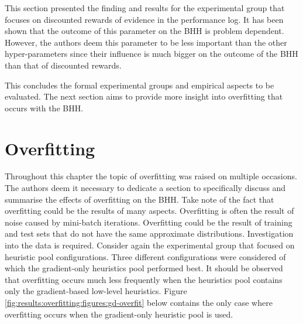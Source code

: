 This section presented the finding and results for the experimental group that focuses on discounted rewards of evidence in the performance log. It has been shown that the outcome of this parameter on the \Ac{BHH} is problem dependent. However, the authors deem this parameter to be less important than the other hyper-parameters since their influence is much bigger on the outcome of the \Ac{BHH} than that of discounted rewards.

This concludes the formal experimental groups and empirical aspects to be evaluated. The next section aims to provide more insight into overfitting that occurs with the \Ac{BHH}.






\section{Overfitting}
\label{sec:results:overfitting}

Throughout this chapter the topic of overfitting was raised on multiple occasions. The authors deem it necessary to dedicate a section to specifically discuss and summarise the effects of overfitting on the \Ac{BHH}. Take note of the fact that overfitting could be the results of many aspects. Overfitting is often the result of noise caused by mini-batch iterations. Overfitting could be the result of training and test sets that do not have the same approximate distributions. Investigation into the data is required. Consider again the experimental group that focused on heuristic pool configurations. Three different configurations were considered of which the gradient-only heuristics pool performed best. It should be observed that overfitting occurs much less frequently when the heuristics pool contains only the gradient-based low-level heuristics. Figure \ref{fig:results:overfitting:figures:gd-overfit} below contains the only case where overfitting occurs when the gradient-only heuristic pool is used.


